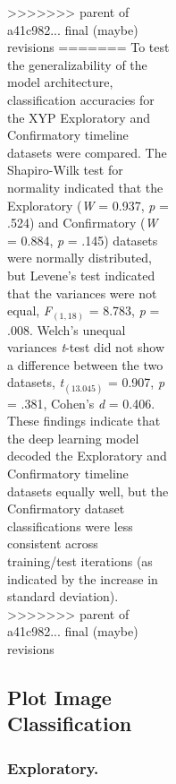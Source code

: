 \documentclass[
  english,
  man, donotrepeattitle,floatsintext]{apa6}
\begin{document}
\begin{figure}
\begin{figure}
\begin{figure}
\begin{figure}
>>>>>>> parent of a41c982... final (maybe) revisions
=======
To test the generalizability of the model architecture, classification accuracies for the XYP Exploratory and Confirmatory timeline datasets were compared. The Shapiro-Wilk test for normality indicated that the Exploratory (\emph{W} = 0.937, \emph{p} = .524) and Confirmatory (\emph{W} = 0.884, \emph{p} = .145) datasets were normally distributed, but Levene's test indicated that the variances were not equal, \emph{F}\(_{(1, 18)}\) = 8.783, \emph{p} = .008. Welch's unequal variances \emph{t}-test did not show a difference between the two datasets, \emph{t}\(_{(13.045)}\) = 0.907, \emph{p} = .381, Cohen's \emph{d} = 0.406. These findings indicate that the deep learning model decoded the Exploratory and Confirmatory timeline datasets equally well, but the Confirmatory dataset classifications were less consistent across training/test iterations (as indicated by the increase in standard deviation).
>>>>>>> parent of a41c982... final (maybe) revisions

\subsection{Plot Image Classification}
\subsubsection{Exploratory.}


\end{figure}
\end{figure}
\end{figure}
\end{figure}
\end{document}
